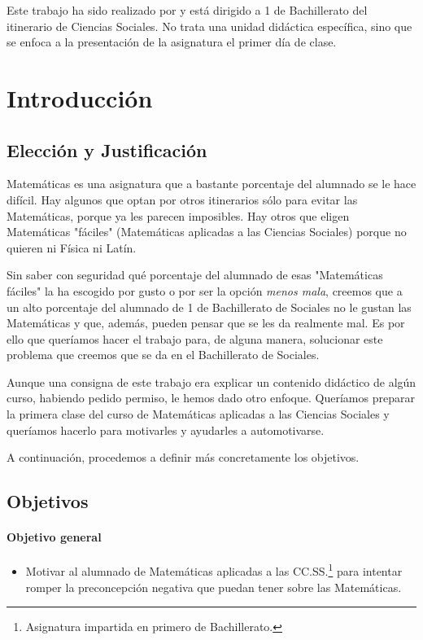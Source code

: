 
Este trabajo ha sido realizado por \theauthor y está dirigido a 1 de Bachillerato del itinerario de Ciencias Sociales.
%
No trata una unidad didáctica específica, sino que se enfoca a la presentación de la asignatura el primer día de clase.


\section{Introducción}


\subsection{Elección y Justificación}

Matemáticas es una asignatura que a bastante porcentaje del alumnado se le hace difícil. 
%
Hay algunos que optan por otros itinerarios sólo para evitar las Matemáticas, porque ya les parecen imposibles.
%
Hay otros que eligen Matemáticas "fáciles" (Matemáticas aplicadas a las Ciencias Sociales) porque no quieren ni Física ni Latín.

Sin saber con seguridad qué porcentaje del alumnado de esas "Matemáticas fáciles" la ha escogido por gusto o por ser la opción \textit{menos mala}, creemos que a un alto porcentaje del alumnado de 1 de Bachillerato de Sociales no le gustan las Matemáticas y que, además, pueden pensar que se les da realmente mal. 
%
Es por ello que queríamos hacer el trabajo para, de alguna manera, solucionar este problema que creemos que se da en el Bachillerato de Sociales.

Aunque una consigna de este trabajo era explicar un contenido didáctico de algún curso, habiendo pedido permiso, le hemos dado otro enfoque. 
%
Queríamos preparar la primera clase del curso de Matemáticas aplicadas a las Ciencias Sociales y queríamos hacerlo para motivarles y ayudarles a automotivarse.

A continuación, procedemos a definir más concretamente los objetivos.


\subsection{Objetivos}

\paragraph{Objetivo general}
\begin{itemize}
	\item Motivar al alumnado de Matemáticas aplicadas a las CC.SS.\footnote{Asignatura impartida en primero de Bachillerato.} para intentar romper la preconcepción negativa que puedan tener sobre las Matemáticas. 
\end{itemize}

